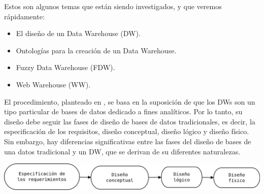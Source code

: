 \documentclass{fancyslides}
\begin{document}
\startingslide %

\begin{frame}
\end{frame}

\begin{frame}
\misc
{
Estos son algunos temas que están siendo investigados, y que veremos rápidamente:
\begin{itemize}
  \item El diseño de un Data Warehouse (DW).
  \item Ontologías para la creación de un Data Warehouse.
  \item Fuzzy Data Warehouse (FDW).
  \item Web Warehouse (WW).
\end{itemize}
}
\end{frame}

\begin{frame}
\end{frame}

\begin{frame}
\misc
{

 \justifying El procedimiento, planteado en \cite{VaismanZimanyi14}, se basa en la suposición de que los DWs son un tipo particular de bases de datos dedicado a fines analíticos. Por lo tanto, su diseño debe seguir las fases de diseño de bases de datos tradicionales, es decir, la especificación de los requisitos, diseño conceptual, diseño lógico y diseño físico. Sin embargo, hay diferencias significativas entre las fases del diseño de bases de una datos tradicional y un DW, que se derivan de su diferentes naturalezas.

\begin{center}
\includegraphics[scale=0.25]{diseno1}  
\end{center}

}
\end{frame}
\end{document}
